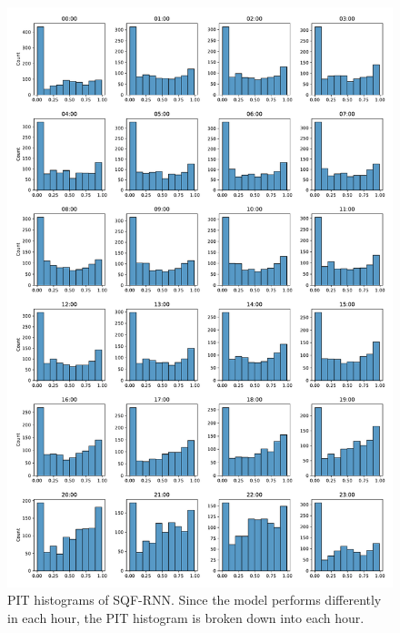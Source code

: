 \begin{figure}[h]%
    \centering
    \includegraphics[width=\textwidth]{plots/pit/pit_by_hour_sqf-rnn.pdf}
    \caption[PIT histograms SQF-RNN]{PIT histograms of SQF-RNN. Since the model performs differently 
    in each hour, the PIT histogram is broken down into each hour.}%
    \label{fig:pit-sqf-rnn-by-hour}%
\end{figure}

